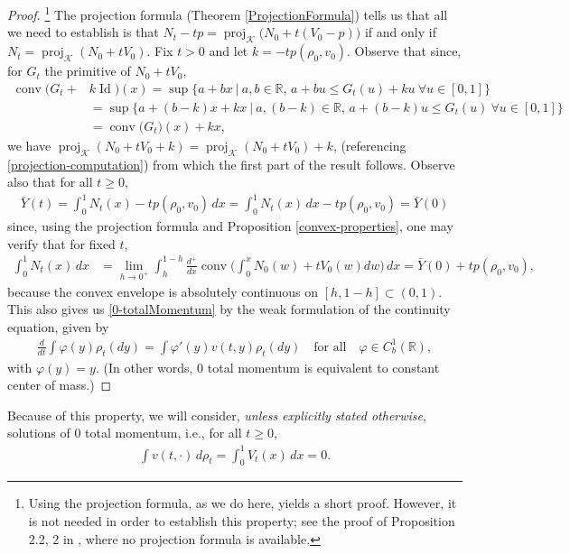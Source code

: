 \documentclass[11pt]{article}
\numberwithin{equation}{section}
\DeclareMathOperator{\proj}{proj}
\DeclareMathOperator{\Id}{Id}
\DeclareMathOperator{\conv}{conv}
\begin{document}
    \begin{proof} \!\!\!\! \footnote{Using the projection formula, as we do here, yields a short proof. However, it is not needed in order to establish this property; see the proof of Proposition 2.2, 2 in \cite{Repulsive-Paper}, where no projection formula is available.}
        The projection formula (Theorem \ref{ProjectionFormula}) tells us that all we need to establish is that $N_t-tp=\proj_{\mathcal{K}}\big(N_0+t(V_0-p)\big)$ if and only if $N_t=\proj_{\mathcal{K}}(N_0+tV_0)$. Fix $t>0$ and let $k=-tp(\rho_0,v_0)$. Observe that since, for $G_t$ the primitive of $N_0+tV_0$, 
        \begin{align*}
            \conv\big(G_t+&k\Id\big)(x)=\sup\big\{a+bx \ \big| \ a,b\in\mathbb{R}\text{, }a+bu\leq G_t(u)+ku \ \forall u\in[0,1]\big\}
            \\
            &=\sup\big\{a+(b-k)x+kx \ \big| \ a,(b-k)\in\mathbb{R}\text{, }a+(b-k)u\leq G_t(u) \ \forall u\in[0,1]\big\}
            \\
            &=\conv\big(G_t\big)(x)+kx, 
        \end{align*}
        we have $\proj_{\mathcal{K}}(N_0+tV_0+k)=\proj_{\mathcal{K}}(N_0+tV_0)+k$, (referencing \eqref{projection-computation}) from which the first part of the result follows. Observe also that for all $t\geq0$, 
        \begin{align*}
            \bar{Y}(t)=\int_0^1 N_t(x)-tp(\rho_0,v_0) \, dx=\int_0^1 N_t(x) \, dx-tp(\rho_0,v_0)=\bar{Y}(0) 
        \end{align*}
        since, using the projection formula and Proposition \ref{convex-properties}, one may verify that for fixed $t$,
        \begin{align*}
            \int_0^1 N_t(x) \, dx&=\lim_{h\to0^+}\int_h^{1-h}\frac{d^+}{dx}\conv\Big(\int_0^x N_0(w)+tV_0(w)dw\Big) \, dx=\bar{Y}(0)+tp(\rho_0,v_0),
        \end{align*}
        because the convex envelope is absolutely continuous on $[h,1-h]
        \subset(0,1)$. This also gives us \eqref{0-totalMomentum} by the weak formulation of the continuity equation, given by 
        \begin{align*}
            \frac{d}{dt}\int\varphi(y)\rho_t(dy)=\int\varphi'(y)v(t,y)\rho_t(dy) \quad \text{for all} \quad \varphi\in C_b^1(\mathbb{R}), 
        \end{align*}
        with $\varphi(y)=y$. (In other words, $0$ total momentum is equivalent to constant center of mass.)
    \end{proof}
    Because of this property, we will consider, \textit{unless explicitly stated otherwise}, solutions of $0$ total momentum, i.e., for all $t\geq0$,
    \begin{align}\label{0-total-momentum}
        \int v(t,\cdot) \, d\rho_t=\int_0^1 V_t(x) \, dx=0.
    \end{align}
\end{document}
